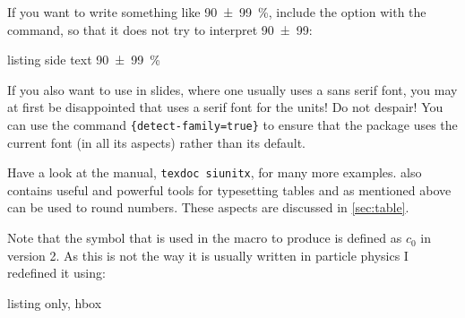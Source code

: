 If you want to write something like \SI[parse-numbers=false]{90(99)}{\%},
include the option  with the  command,
so that it does not try to interpret \num[parse-numbers=false]{90(99)}:
\begin{tcblisting}{listing side text}
\SI[parse-numbers=false]{90(99)}{\%}
\end{tcblisting}

If you also want to use  in slides, where one usually
uses a sans serif font, you may at first be disappointed that
 uses a serif font for the units! Do not despair!
You can use the command
\texttt{\{detect-family=true\}} %
to ensure that the package uses the current font
(in all its aspects) rather than its default.

Have a look at the manual, \texttt{texdoc siunitx}, for many more
examples.  also contains useful and powerful tools
for typesetting tables and as mentioned above can be used to round
numbers. These aspects are discussed in \cref{sec:table}.

Note that the  symbol that is used in the macro
 to produce \si{\MeVovercsq} is defined as \(c_{0}\) in
 version 2. As this is not the way it is usually
written in particle physics I redefined it using:
\begin{tcblisting}{listing only, hbox}
\DeclareSIUnit{}
\end{tcblisting}

